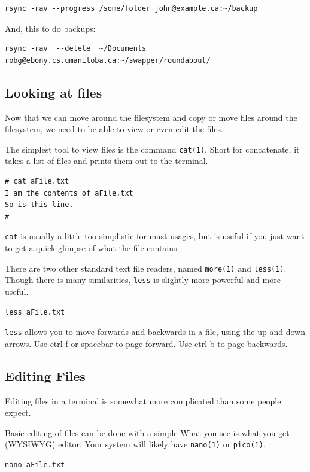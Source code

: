 {\tt \begin{verbatim}
rsync -rav --progress /some/folder john@example.ca:~/backup
\end{verbatim}
}

And, this to do backups:
{\tt \begin{verbatim}
rsync -rav  --delete  ~/Documents robg@ebony.cs.umanitoba.ca:~/swapper/roundabout/
\end{verbatim}
}



\subsection{Looking at files}
Now that we can move around the filesystem and copy or move
files around the filesystem, we need to be able to view
or even edit the files.

The simplest tool to view files is the command {\tt cat(1)}.
Short for concatenate, it takes a list of files and prints them out to
the terminal.

{\tt \begin{verbatim}
# cat aFile.txt
I am the contents of aFile.txt
So is this line.
#
\end{verbatim}
}

{\tt cat} is usually a little too simplistic for must usages,
but is useful if you just want to get a quick glimpse of what 
the file contains.

There are two other standard text file readers, named {\tt more(1)}
and {\tt less(1)}. Though there is many similarities, {\tt less} is slightly
more powerful and more useful.

{\tt \begin{verbatim}
less aFile.txt
\end{verbatim}
}

{\tt less} allows you to move forwards and backwards in a file, using the up and down arrows.
Use ctrl-f or spacebar to page forward. Use ctrl-b to page backwards.

\subsection{Editing Files}
Editing files in a terminal is somewhat more complicated 
than some people expect.

Basic editing of files can be done with a simple What-you-see-is-what-you-get (WYSIWYG)
editor.  Your system will likely have {\tt nano(1)} or {\tt pico(1)}.
{\tt \begin{verbatim}
nano aFile.txt
\end{verbatim}
}

